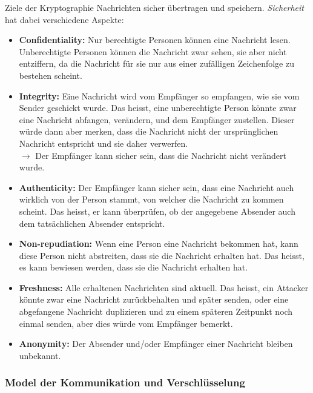 \begin{theorem}{Ziele der Kryptographie}
    Nachrichten sicher übertragen und speichern. \textit{Sicherheit} hat dabei verschiedene Aspekte:
    \begin{itemize}
        \item \textcolor{darkfrog}{\textbf{Confidentiality:}} Nur berechtigte Personen können eine Nachricht lesen. Unberechtigte Personen können die Nachricht zwar sehen, sie aber nicht entziffern, da die Nachricht für sie nur aus einer zufälligen Zeichenfolge zu bestehen scheint.
        \item \textcolor{darkfrog}{\textbf{Integrity:}} Eine Nachricht wird vom Empfänger so empfangen, wie sie vom Sender geschickt wurde. Das heisst, eine unberechtigte Person könnte zwar eine Nachricht abfangen, verändern, und dem Empfänger zustellen. Dieser würde dann aber merken, dass die Nachricht nicht der ursprünglichen Nachricht entspricht und sie daher verwerfen.
        \\ $\rightarrow$ Der Empfänger kann sicher sein, dass die Nachricht nicht verändert wurde.
        \item \textcolor{darkfrog}{\textbf{Authenticity:}} Der Empfänger kann sicher sein, dass eine Nachricht auch wirklich von der Person stammt, von welcher die Nachricht zu kommen scheint. Das heisst, er kann überprüfen, ob der angegebene Absender auch dem tatsächlichen Absender entspricht.
        \item \textcolor{darkfrog}{\textbf{Non-repudiation:}} Wenn eine Person eine Nachricht bekommen hat, kann diese Person nicht abstreiten, dass sie die Nachricht erhalten hat. Das heisst, es kann bewiesen werden, dass sie die Nachricht erhalten hat.
        \item \textcolor{darkfrog}{\textbf{Freshness:}} Alle erhaltenen Nachrichten sind aktuell. Das heisst, ein Attacker könnte zwar eine Nachricht zurückbehalten und später senden, oder eine abgefangene Nachricht duplizieren und zu einem späteren Zeitpunkt noch einmal senden, aber dies würde vom Empfänger bemerkt.
        \item \textcolor{darkfrog}{\textbf{Anonymity:}} Der Absender und/oder Empfänger einer Nachricht bleiben unbekannt.
    \end{itemize}
\end{theorem}


\subsubsection{Model der Kommunikation und Verschlüsselung}

